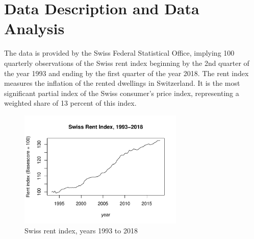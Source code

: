\documentclass[11pt,a4paper]{article}
\begin{document}

\section{Data Description and Data Analysis}

The data is provided by the Swiss Federal Statistical Office, implying 100 quarterly observations of the Swiss rent index beginning by the 2nd quarter of the year 1993 and ending by the first quarter of the year 2018.
The rent index measures the inflation of the rented dwellings in Switzerland.
It is the most significant partial index of the Swiss consumer’s price index, representing a weighted share of 13 percent of this index.

\begin{figure} [ht]
    \centering
    \includegraphics[width=0.7\textwidth]{indiceloyers_timeseries}
    \caption{Swiss rent index, years 1993 to 2018}
    \label{fig:indiceloyers_timeseries}
\end{figure}
\end{document}
